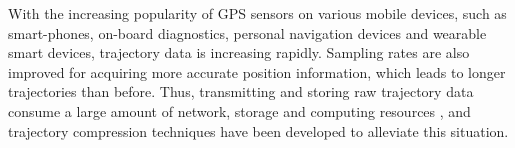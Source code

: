 %
With the increasing popularity of GPS sensors on various mobile devices, such as smart-phones, on-board diagnostics, personal navigation devices and wearable smart devices, trajectory data is increasing rapidly. Sampling rates are also improved for acquiring more accurate position information, which leads to longer trajectories than before. Thus, transmitting and storing raw trajectory data consume a large amount of network, storage and computing resources \cite{Chen:Trajectory, Chen:Fast, Meratnia:Spatiotemporal, Keogh:online, Liu:BQS, Muckell:Compression,Cao:Spatio, Popa:Spatio, Schmid:Semantic,Richter:Semantic,Long:Direction,Nibali:Trajic}, and trajectory compression techniques \cite{Douglas:Peucker, Hershberger:Speeding, Meratnia:Spatiotemporal, Liu:BQS, Muckell:Compression, Chen:Trajectory, Chen:Fast, Keogh:online, Cao:Spatio, Shi:Survey, Richter:Semantic ,Long:Direction, Song:PRESS, Nibali:Trajic} have been developed to alleviate this situation.
%
%
%

